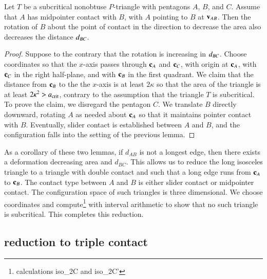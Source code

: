 \begin{lemma}  
  Let $T$ be a subcritical nonobtuse $P$-triangle with pentagons $A$, $B$, and
  $C$.  Assume that $A$ has midpointer contact with $B$, with $A$
  pointing to $B$ at ${\mathbf v}_{AB}$.  Then the rotation of $B$ about the
  point of contact in the direction to decrease the area also
  decreases the distance $d_{BC}$.
\end{lemma}

\begin{proof} 
  Suppose to the contrary that the rotation is increasing in
  $d_{BC}$.  Choose coordinates so that the $x$-axis passes through
  ${\mathbf c}_A$ and ${\mathbf c}_C$, with origin at ${\mathbf c}_A$, with ${\mathbf c}_C$ in the right
  half-plane, and with ${\mathbf c}_B$ in the first quadrant.  We claim that
  the distance from ${\mathbf c}_B$ to the the $x$-axis is at least $2\kappa$
  so that the area of the triangle is at least $2\kappa^2 > a_\text{crit}$,
  contrary to the assumption that the triangle $T$ is subcritical.  To
  prove the claim, we disregard the pentagon $C$.  We translate $B$
  directly downward, rotating $A$ as needed about ${\mathbf c}_A$ so that it
  maintains pointer contact with $B$.  Eventually, slider contact is
  established between $A$ and $B$, and the configuration falls into
  the setting of the previous lemma.
\end{proof}

As a corollary of these two lemmas, if $d_{AB}$ is not a longest edge, then
there exists a deformation decreasing area and $d_{BC}$.  This allows us to
 reduce the long isosceles triangle to a triangle with double
contact and such that a long edge runs from   ${\mathbf c}_A$ to ${\mathbf c}_B$.
The contact type between $A$ and $B$ is
either slider contact or midpointer contact.  The configuration space
of such triangles is three dimensional.  We choose coordinates and
compute\footnote{calculations iso\_2C and iso\_2C'} with interval
arithmetic to show that no such triangle is subcritical.  This
completes this reduction.

\subsection{reduction to triple contact}

